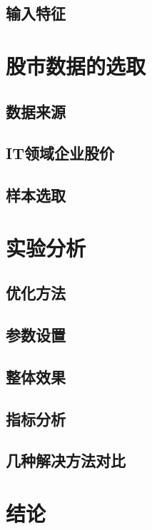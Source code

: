 \documentclass[UTF8]{ctexart}
\begin{document}
\subsection{输入特征}
\section{股市数据的选取}
\subsection{数据来源}
\subsection{IT领域企业股价}
\subsection{样本选取}
\section{实验分析}
\subsection{优化方法}
\subsection{参数设置}
\subsection{整体效果}
\subsection{指标分析}
\subsection{几种解决方法对比}
\section{结论}


\end{document}
